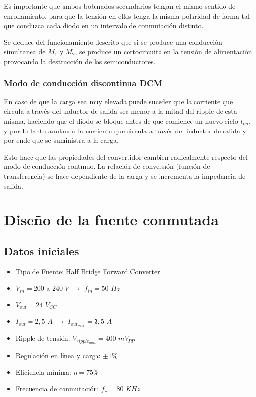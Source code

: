 \documentclass[11pt, a4paper]{article}
\begin{document}
Es importante que ambos bobinados secundarios tengan el mismo sentido de enrollamiento, para que la tensión en ellos tenga la misma polaridad de forma tal que conduzca cada diodo en un intervalo de conmutación distinto.

Se deduce del funcionamiento descrito que si se produce una conducción simultanea de $M_1$ y $M_2$, se produce un cortocircuito en la tensión de alimentación provocando la destrucción de los semiconductores.

\subsubsection{Modo de conducción discontinua DCM}
En caso de que la carga sea muy elevada puede suceder que la corriente que circula a través del inductor de salida sea menor a la mitad del ripple de esta misma, haciendo que el diodo se bloque antes de que comience un nuevo ciclo $t_{on}$, y por lo tanto anulando la corriente que circula a través del inductor de salida y por ende que se suministra a la carga.

Esto hace que las propiedades del convertidor cambien radicalmente respecto del modo de conducción continuo. La relación de conversión (función de transferencia) se hace dependiente de la carga y se incrementa la impedancia de salida.

\vfill
\section{Diseño de la fuente conmutada}
\subsection{Datos iniciales}
\begin{itemize}
	\item Tipo de Fuente: Half Bridge Forward Converter
	\item $V_{in} = 200$ a $240$ $V$ $\rightarrow$ $f_{in} = 50$ $Hz$
	\item $V_{out} = 24$ $V_{CC}$
	\item $I_{out} = 2,5$ $A$ $\rightarrow$ $I_{out_{max}} = 3,5$ $A$
	\item Ripple de tensión: $V_{ripple_{max}} = 400$ $mV_{PP}$
	\item Regulación en línea y carga: $\pm 1 \%$
	\item Eficiencia mínima: $\eta = 75 \%$
	\item Frecuencia de conmutación: $f_c = 80$ $KHz$
\end{itemize}
\end{document}
